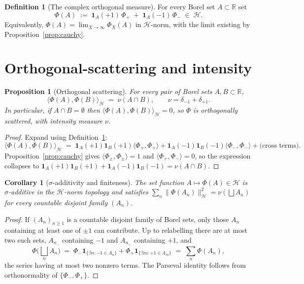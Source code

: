 \documentclass[11pt]{article}
\newtheorem{proposition}[theorem]{Proposition}
\newtheorem{corollary}[theorem]{Corollary}
\theoremstyle{definition}
\newtheorem{definition}[theorem]{Definition}
\theoremstyle{remark}
\begin{document}
\begin{definition}[The complex orthogonal measure]\label{def:limit-measure}
For every Borel set $A\subset\mathbb{R}$ set
\[
  \Phi(A)\;:=\;\mathbf{1}_A(+1)\,\Phi_+\;+\;\mathbf{1}_A(-1)\,\Phi_-\;\in\;\mathcal{H}.
\]
Equivalently, $\Phi(A)=\lim_{X\to\infty}\Phi_X(A)$ in $\mathcal{H}$-norm, with the limit existing by Proposition~\ref{prop:cauchy}.
\end{definition}

\section{Orthogonal-scattering and intensity}\label{sec:scatter}

\begin{proposition}[Orthogonal scattering]\label{prop:orthogonal}
For every pair of Borel sets $A,B\subset\mathbb{R}$,
\[
  \langle\Phi(A),\Phi(B)\rangle_\mathcal{H}\;=\;\nu(A\cap B),\qquad \nu=\delta_{-1}+\delta_{+1}.
\]
In particular, if $A\cap B=\emptyset$ then $\langle\Phi(A),\Phi(B)\rangle_\mathcal{H}=0$, so $\Phi$ is orthogonally scattered, with intensity measure $\nu$.
\end{proposition}

\begin{proof}
Expand using Definition~\ref{def:limit-measure}:
\[
  \langle\Phi(A),\Phi(B)\rangle_\mathcal{H}\;=\;\mathbf{1}_A(+1)\mathbf{1}_B(+1)\langle\Phi_+,\Phi_+\rangle+\mathbf{1}_A(-1)\mathbf{1}_B(-1)\langle\Phi_-,\Phi_-\rangle+\text{(cross terms)}.
\]
Proposition~\ref{prop:cauchy} gives $\langle\Phi_\pm,\Phi_\pm\rangle=1$ and $\langle\Phi_+,\Phi_-\rangle=0$, so the expression collapses to $\mathbf{1}_A(+1)\mathbf{1}_B(+1)+\mathbf{1}_A(-1)\mathbf{1}_B(-1)=\nu(A\cap B)$.
\end{proof}

\begin{corollary}[$\sigma$-additivity and finiteness]\label{cor:sigma}
The set function $A\mapsto\Phi(A)\in\mathcal{H}$ is $\sigma$-additive in the $\mathcal{H}$-norm topology and satisfies $\sum_n\|\Phi(A_n)\|_\mathcal{H}^2=\nu(\bigsqcup A_n)$ for every countable disjoint family $(A_n)$.
\end{corollary}

\begin{proof}
If $(A_n)_{n\ge 1}$ is a countable disjoint family of Borel sets, only those $A_n$ containing at least one of $\pm 1$ can contribute. Up to relabelling there are at most two such sets, $A_{n_-}$ containing $-1$ and $A_{n_+}$ containing $+1$, and
\[
  \Phi\Big(\bigsqcup_n A_n\Big)\;=\;\Phi_-\mathbf{1}_{\{\exists n:-1\in A_n\}}+\Phi_+\mathbf{1}_{\{\exists m:+1\in A_m\}}\;=\;\sum_n\Phi(A_n),
\]
the series having at most two nonzero terms. The Parseval identity follows from orthonormality of $\{\Phi_-,\Phi_+\}$.
\end{proof}
\end{document}
